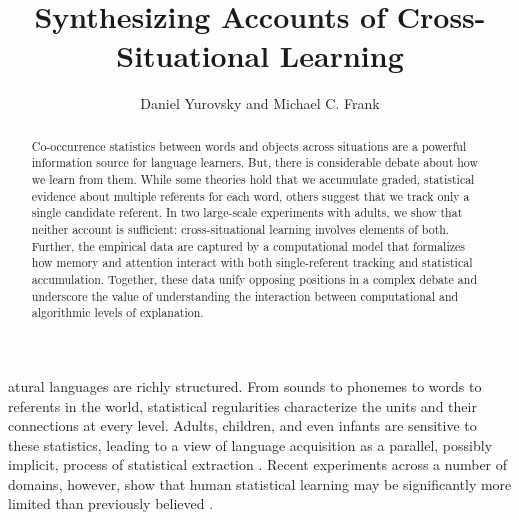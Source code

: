 \documentclass{pnastwo}
\begin{document}
\title{Synthesizing Accounts of Cross-Situational Learning}
\author{Daniel Yurovsky and Michael C. Frank}



\maketitle


\begin{article}
\begin{abstract}

Co-occurrence statistics between words and objects across situations are a powerful information source for language learners. But, there is considerable debate about how we learn from them. While some theories hold that we accumulate graded, statistical evidence about multiple referents for each word, others suggest that we track only a single candidate referent. In two large-scale experiments with adults, we show that neither account is sufficient: cross-situational learning involves elements of both. Further, the empirical data are captured by a computational model that formalizes how memory and attention interact with both single-referent tracking and statistical accumulation. Together, these data unify opposing positions in a complex debate and underscore the value of understanding the interaction between computational and algorithmic levels of explanation.
\end{abstract}
\abbreviations{}


atural languages are richly structured. From sounds to phonemes to words to referents in the world, statistical regularities characterize the units and their connections at every level. Adults, children, and even infants are sensitive to these statistics, leading to a view of language acquisition as a parallel, possibly implicit, process of statistical extraction \cite{Saffran1996a,Gomez2000}. Recent experiments across a number of domains, however, show that human statistical learning may be significantly more limited than previously believed \cite{Johnson2010c, Yurovsky2012c, Trueswell2013}.


\end{article}
\end{document}
